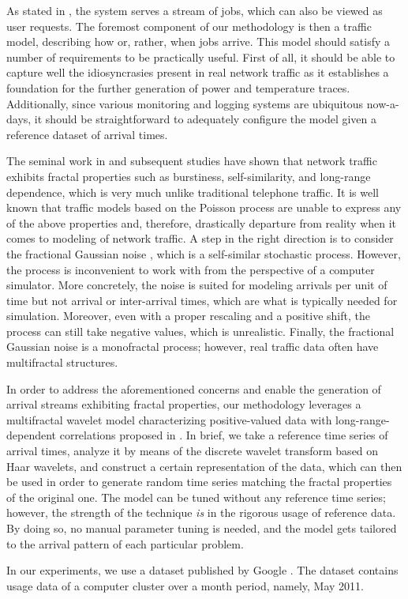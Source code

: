 As stated in , the system serves a stream of jobs,
which can also be viewed as user requests. The foremost component of our
methodology is then a traffic model, describing how or, rather, when jobs
arrive. This model should satisfy a number of requirements to be practically
useful. First of all, it should be able to capture well the idiosyncrasies
present in real network traffic as it establishes a foundation for the further
generation of power and temperature traces. Additionally, since various
monitoring and logging systems are ubiquitous now-a-days, it should be
straightforward to adequately configure the model given a reference dataset of
arrival times.

The seminal work in \cite{leland1994} and subsequent studies have shown that
network traffic exhibits fractal properties such as burstiness, self-similarity,
and long-range dependence, which is very much unlike traditional telephone
traffic. It is well known that traffic models based on the Poisson process
\cite{lifshits2014} are unable to express any of the above properties and,
therefore, drastically departure from reality when it comes to modeling of
network traffic. A step in the right direction is to consider the fractional
Gaussian noise \cite{lifshits2014}, which is a self-similar stochastic process.
However, the process is inconvenient to work with from the perspective of a
computer simulator. More concretely, the noise is suited for modeling arrivals
per unit of time but not arrival or inter-arrival times, which are what is
typically needed for simulation. Moreover, even with a proper rescaling and a
positive shift, the process can still take negative values, which is
unrealistic. Finally, the fractional Gaussian noise is a monofractal process;
however, real traffic data often have multifractal structures.

In order to address the aforementioned concerns and enable the generation of
arrival streams exhibiting fractal properties, our methodology leverages a
multifractal wavelet model characterizing positive-valued data with
long-range-dependent correlations proposed in \cite{riedi1999}. In brief, we
take a reference time series of arrival times, analyze it by means of the
discrete wavelet transform based on Haar wavelets, and construct a certain
representation of the data, which can then be used in order to generate random
time series matching the fractal properties of the original one. The model can
be tuned without any reference time series; however, the strength of the
technique \emph{is} in the rigorous usage of reference data. By doing so, no
manual parameter tuning is needed, and the model gets tailored to the arrival
pattern of each particular problem.

In our experiments, we use a dataset published by Google \cite{google}. The
dataset contains usage data of a computer cluster over a month period, namely,
May 2011.
